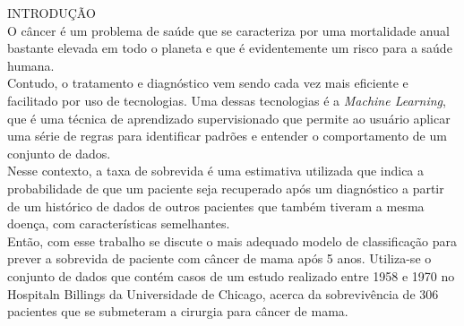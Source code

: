 
\noindent \textcolor{COLOR2}{INTRODUÇÃO}
\\


O câncer é um problema de saúde que se caracteriza por uma mortalidade anual bastante elevada em todo o planeta e que é evidentemente um risco para a saúde humana.\\

Contudo, o tratamento e diagnóstico vem sendo cada vez mais eficiente e facilitado por uso de tecnologias. Uma dessas tecnologias é a \textit{Machine Learning}, que é uma técnica de aprendizado supervisionado que permite ao usuário aplicar uma série de regras para identificar padrões e entender o comportamento de um conjunto de dados.\\

Nesse contexto, a taxa de sobrevida é uma estimativa utilizada que indica a probabilidade de que um paciente seja recuperado após um diagnóstico a partir de um histórico de dados de outros pacientes que também tiveram a mesma doença, com características semelhantes.\\

Então, com esse trabalho se discute o mais adequado modelo de classificação para prever a sobrevida de paciente com câncer de mama após 5 anos. Utiliza-se o conjunto de dados que contém casos de um estudo realizado entre 1958 e 1970 no Hospitaln Billings da Universidade de Chicago, acerca da sobrevivência de 306 pacientes que se submeteram a cirurgia para câncer de mama.
